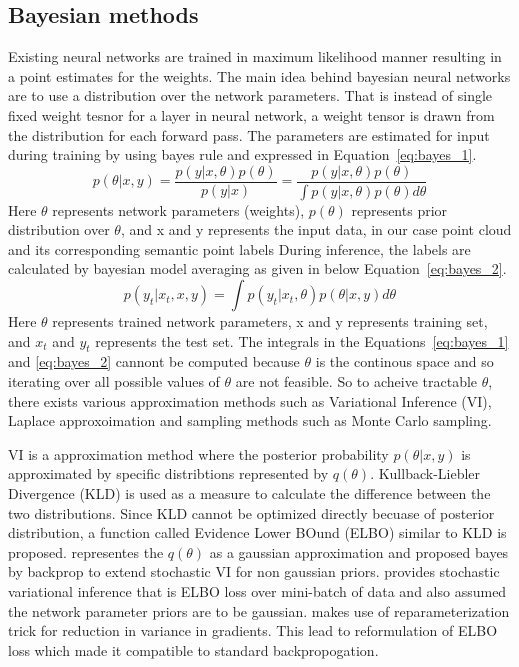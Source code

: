    \subsection{Bayesian methods}
    Existing neural networks are trained in maximum likelihood manner resulting in a point estimates for the weights.
    The main idea behind bayesian neural networks are to use a distribution over the network parameters.
    That is instead of single fixed weight tesnor for a layer in neural network, a weight tensor is drawn from the distribution for each forward pass.
    The parameters are estimated for input during training by using bayes rule and expressed in Equation~\ref{eq:bayes_1}.
    \begin{equation}
        p(\theta|x, y) = \frac{p(y|x, \theta)p(\theta)}{p(y|x)} = \frac{p(y|x, \theta)p(\theta)}{\int p(y|x, \theta) p(\theta) d\theta} \label{eq:bayes_1}
    \end{equation}
    Here $\theta$ represents network parameters (weights), $p(\theta)$ represents prior distribution over $\theta$, and x and y represents the input data, in our case point cloud and its corresponding semantic point labels
    During inference, the labels are calculated by bayesian model averaging as given in below Equation~\ref{eq:bayes_2}.
    \begin{equation}
        p(y_t|x_t, x, y) = \int p(y_t|x_t, \theta)p(\theta|x, y)d\theta \label{eq:bayes_2}  
    \end{equation}
    Here $\theta$ represents trained network parameters, x and y represents training set, and $x_t$ and $y_t$ represents the test set.
    The integrals in the Equations~\ref{eq:bayes_1} and \ref{eq:bayes_2} cannont be computed because $\theta$ is the continous space and so iterating over all possible values of $\theta$ are not feasible.
    So to acheive tractable $\theta$, there exists various  approximation methods such as Variational Inference (VI), Laplace approxoimation and sampling methods such as Monte Carlo sampling.

    VI is a approximation method where the posterior probability $p(\theta|x, y)$ is approximated by specific distribtions represented by $q(\theta)$.
    Kullback-Liebler Divergence (KLD) is used as a measure to calculate the difference between the two distributions. 
    Since KLD cannot be optimized directly becuase of posterior distribution, a function called Evidence Lower BOund (ELBO) similar to KLD is proposed.
    \cite{Gaussian_Priors} representes the $q(\theta)$ as a gaussian approximation and \cite{weight_uncertainty} proposed bayes by backprop to extend stochastic VI for non gaussian priors.
    \cite{Non_Gaussian_Priors} provides stochastic variational inference that is ELBO loss over mini-batch of data and also assumed the network parameter priors are to be gaussian.
    \cite{Flipout} makes use of reparameterization trick for reduction in variance in gradients. This lead to reformulation of ELBO loss which made it compatible to standard backpropogation.

